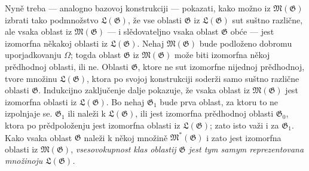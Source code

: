 \documentclass[11pt]{article}
\begin{document}
Nyně treba --- analogno bazovoj konstrukciji --- pokazati, kako možno iz
$\mathfrak M(\mathfrak G)$ izbrati tako podmnožstvo
$\mathfrak L(\mathfrak G)$, že vse oblasti $\mathfrak G$ iz
$\mathfrak L(\mathfrak G)$ sut suštno različne, ale vsaka oblast iz
$\mathfrak M(\mathfrak G)$ --- i slědovateljno vsaka oblast $\mathfrak G$
obće --- jest izomorfna někakoj oblasti iz $\mathfrak L(\mathfrak G)$. Nehaj
$\mathfrak M(\mathfrak G)$ bude podloženo dobromu uporjadkovanju $\Omega$;
togda oblast $\mathfrak G$ iz $\mathfrak M(\mathfrak G)$ može biti izomorfna
někoj prědhodnoj oblasti, ili ne. Oblasti $\mathfrak G$, ktore ne sut
izomorfne nijednoj prědhodnoj, tvore množinu $\mathfrak L(\mathfrak G)$, ktora
po svojoj konstrukciji soderži samo suštno različne oblasti $\mathfrak G$.
Indukcijno zaključenje dalje pokazuje, že vsaka oblast iz
$\mathfrak M(\mathfrak G)$ jest izomorfna oblasti iz
$\mathfrak L(\mathfrak G)$. Bo nehaj $\mathfrak G_1$ bude prva oblast, za
ktoru to ne izpolnjaje se. $\mathfrak G_1$ ili naleži k
$\mathfrak L(\mathfrak G)$, ili jest izomorfna prědhodnoj oblasti
$\mathfrak G_0$, ktora po prědpoloženju jest izomorfna oblasti iz
$\mathfrak L(\mathfrak G)$; zato isto važi i za $\mathfrak G_1$. Kako vsaka
oblast $\mathfrak G$ naleži k někoj množině $\mathfrak M^*(\mathfrak G)$ i
zato jest izomorfna oblasti iz $\mathfrak M(\mathfrak G)$, {\itshape
vsesovokupnost klas oblastij $\mathfrak G$ jest tym samym reprezentovana
množinoju $\mathfrak L(\mathfrak G)$.}
\end{document}
